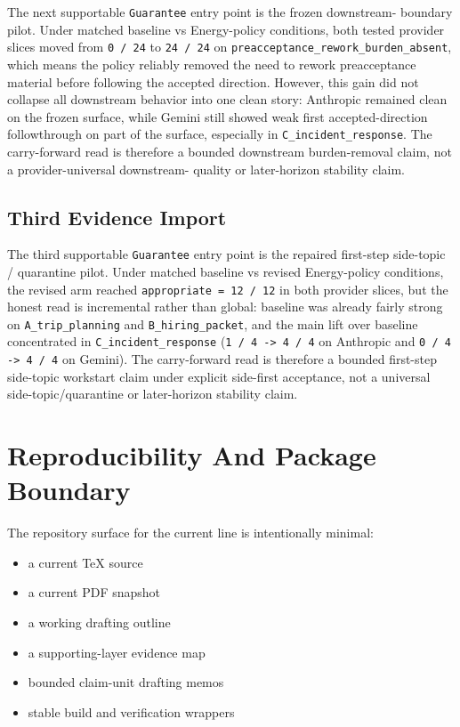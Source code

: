 \documentclass[11pt]{article}
\begin{document}
The next supportable \texttt{Guarantee} entry point is the frozen downstream-
boundary pilot. Under matched baseline vs Energy-policy conditions, both tested
provider slices moved from \texttt{0 / 24} to \texttt{24 / 24} on
\texttt{preacceptance\_rework\_burden\_absent}, which means the policy reliably
removed the need to rework preacceptance material before following the accepted
direction. However, this gain did not collapse all downstream behavior into one
clean story: Anthropic remained clean on the frozen surface, while Gemini still
showed weak first accepted-direction followthrough on part of the surface,
especially in \texttt{C\_incident\_response}. The carry-forward read is therefore
a bounded downstream burden-removal claim, not a provider-universal downstream-
quality or later-horizon stability claim.

\subsection{Third Evidence Import}

The third supportable \texttt{Guarantee} entry point is the repaired first-step
side-topic / quarantine pilot. Under matched baseline vs revised Energy-policy
conditions, the revised arm reached \texttt{appropriate = 12 / 12} in both
provider slices, but the honest read is incremental rather than global:
baseline was already fairly strong on \texttt{A\_trip\_planning} and
\texttt{B\_hiring\_packet}, and the main lift over baseline concentrated in
\texttt{C\_incident\_response} (\texttt{1 / 4 -> 4 / 4} on Anthropic and
\texttt{0 / 4 -> 4 / 4} on Gemini). The carry-forward read is therefore a
bounded first-step side-topic workstart claim under explicit side-first
acceptance, not a universal side-topic/quarantine or later-horizon stability
claim.

\section{Reproducibility And Package Boundary}

The repository surface for the current line is intentionally minimal:
\begin{itemize}
\item a current TeX source
\item a current PDF snapshot
\item a working drafting outline
\item a supporting-layer evidence map
\item bounded claim-unit drafting memos
\item stable build and verification wrappers
\end{itemize}
\end{document}
